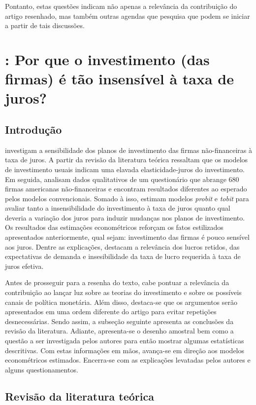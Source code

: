 \documentclass[11pt]{article}
\begin{document}
Pontanto, estas questões indicam não apenas a relevância da contribuição do artigo resenhado, mas também outras agendas que pesquisa que podem se iniciar a partir de tais discussões.

\section*{\textcite{sharpe_2020_Why}: Por que o investimento (das firmas) é tão insensível à taxa de juros?}
\label{sec:org6b67dc8}
\subsection*{Introdução}
\label{sec:org70a903e}

\textcite{sharpe_2020_Why} investigam a sensibilidade dos planos de investimento das firmas não-financeiras à taxa de juros.
A partir da revisão da literatura teórica ressaltam que os modelos de investimento usuais indicam uma elavada elasticidade-juros do investimento.
Em seguida, analisam dados qualitativos de um questionário que abrange 680 firmas americanas não-financeiras e encontram resultados diferentes ao esperado pelos modelos convencionais.
Somado à isso, estimam modelos \emph{probit} e \emph{tobit} para avaliar tanto a insensibilidade do investimento à taxa de juros quanto qual deveria a variação dos juros para induzir mudanças nos planos de investimento.
Os resultados das estimações econométricos reforçam os fatos estilizados apresentados anteriormente, qual sejam: investimento das firmas é pouco sensível aos juros.
Dentre as explicações, destacam a relevância dos lucros retidos, das expectativas de demanda e insesibilidade da taxa de lucro requerida à taxa de juros efetiva.

Antes de prosseguir para a resenha do texto, cabe pontuar a relevância da contribuição ao lançar luz sobre as teorias do investimento e sobre os possíveis canais de política monetária.
Além disso, destaca-se que os argumentos serão apresentados em uma ordem diferente do artigo para evitar repetições desnecessárias.
Sendo assim, a subseção seguinte apresenta as conclusões da revisão da literatura.
Adiante, apresenta-se o desenho amostral bem como a questão a ser investigada pelos autores para então mostrar algumas estatísticas descritivas.
Com estas informações em mãos, avança-se em direção aos modelos econométricos estimados.
Encerra-se com as explicações levatadas pelos autores e alguns questionamentos.


\subsection*{Revisão da literatura teórica}
\label{sec:org624c89d}
\end{document}
